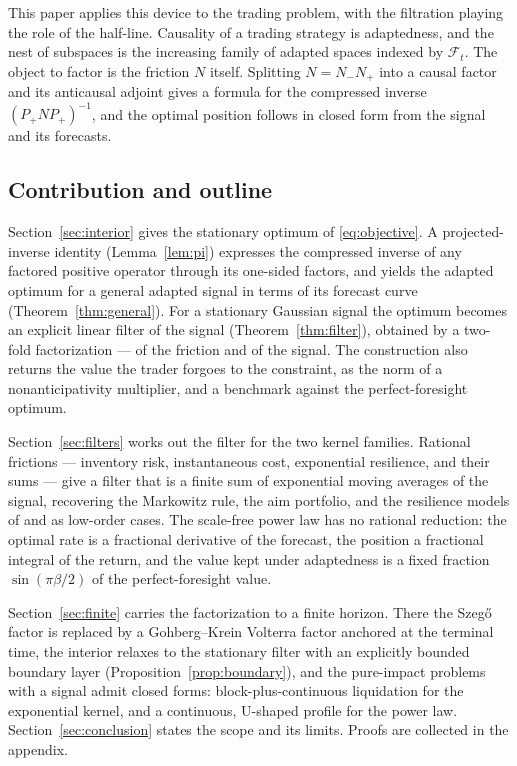 \documentclass[11pt]{article}
\newcommand{\F}{\mathcal{F}}
\theoremstyle{plain}
\theoremstyle{definition}
\theoremstyle{remark}
\begin{document}
This paper applies this device to the trading problem, with the filtration playing the role of the half-line. Causality of a trading strategy is adaptedness, and the nest of subspaces is the increasing family of adapted spaces indexed by $\F_t$. The object to factor is the friction $N$ itself. Splitting $N=N_-N_+$ into a causal factor and its anticausal adjoint gives a formula for the compressed inverse $(P_+NP_+)^{-1}$, and the optimal position follows in closed form from the signal and its forecasts.

\subsection{Contribution and outline}\label{sec:contribution}

Section~\ref{sec:interior} gives the stationary optimum of \eqref{eq:objective}. A projected-inverse identity (Lemma~\ref{lem:pi}) expresses the compressed inverse of any factored positive operator through its one-sided factors, and yields the adapted optimum for a general adapted signal in terms of its forecast curve (Theorem~\ref{thm:general}). For a stationary Gaussian signal the optimum becomes an explicit linear filter of the signal (Theorem~\ref{thm:filter}), obtained by a two-fold factorization --- of the friction and of the signal. The construction also returns the value the trader forgoes to the constraint, as the norm of a nonanticipativity multiplier, and a benchmark against the perfect-foresight optimum.

Section~\ref{sec:filters} works out the filter for the two kernel families. Rational frictions --- inventory risk, instantaneous cost, exponential resilience, and their sums --- give a filter that is a finite sum of exponential moving averages of the signal, recovering the Markowitz rule, the aim portfolio, and the resilience models of \citet{LehalleNeuman2019} and \citet{NeumanVoss2022} as low-order cases. The scale-free power law has no rational reduction: the optimal rate is a fractional derivative of the forecast, the position a fractional integral of the return, and the value kept under adaptedness is a fixed fraction $\sin(\pi\beta/2)$ of the perfect-foresight value.

Section~\ref{sec:finite} carries the factorization to a finite horizon. There the Szeg\H{o} factor is replaced by a Gohberg--Krein Volterra factor anchored at the terminal time, the interior relaxes to the stationary filter with an explicitly bounded boundary layer (Proposition~\ref{prop:boundary}), and the pure-impact problems with a signal admit closed forms: block-plus-continuous liquidation for the exponential kernel, and a continuous, U-shaped profile for the power law. Section~\ref{sec:conclusion} states the scope and its limits. Proofs are collected in the appendix.
\end{document}
